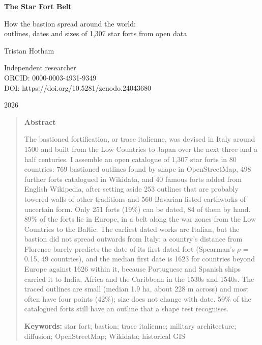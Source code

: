 \documentclass[11pt,a4paper]{article}
\begin{document}
\begin{center}
{\Large\bfseries The Star Fort Belt\par}
\vspace{0.4em}
{\large How the bastion spread around the world:\\outlines, dates and sizes of 1,307 star forts from open data\par}
\vspace{1.2em}
{\large Tristan Hotham\par}
\vspace{0.3em}
{\small Independent researcher\\
ORCID: 0000-0003-4931-9349\\
DOI: https://doi.org/10.5281/zenodo.24043680\par}
\vspace{0.8em}
2026
\end{center}

\begin{quote}
\small
\begin{center}\textbf{Abstract}\end{center}
The bastioned fortification, or trace italienne, was devised in Italy around 1500 and built from the Low Countries to Japan over the next three and a half centuries. I assemble an open catalogue of 1,307 star forts in 80 countries: 769 bastioned outlines found by shape in OpenStreetMap, 498 further forts catalogued in Wikidata, and 40 famous forts added from English Wikipedia, after setting aside 253 outlines that are probably towered walls of other traditions and 560 Bavarian listed earthworks of uncertain form. Only 251 forts (19\%) can be dated, 84 of them by hand. 89\% of the forts lie in Europe, in a belt along the war zones from the Low Countries to the Baltic. The earliest dated works are Italian, but the bastion did not spread outwards from Italy: a country's distance from Florence barely predicts the date of its first dated fort (Spearman's $\rho$ = 0.15, 49 countries), and the median first date is 1623 for countries beyond Europe against 1626 within it, because Portuguese and Spanish ships carried it to India, Africa and the Caribbean in the 1530s and 1540s. The traced outlines are small (median 1.9 ha, about 228 m across) and most often have four points (42\%); size does not change with date. 59\% of the catalogued forts still have an outline that a shape test recognises.

\textbf{Keywords:} star fort; bastion; trace italienne; military architecture; diffusion; OpenStreetMap; Wikidata; historical GIS
\end{quote}
\end{document}
